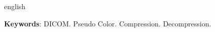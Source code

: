 \begin{resumo}[ABSTRACT] 
\begin{otherlanguage*}{english}

\lipsum[1]

\vspace{\onelineskip} 
\noindent 

\textbf{Keywords}: DICOM. Pseudo Color. Compression. Decompression.
\end{otherlanguage*} 
\end{resumo} 
\newpage

